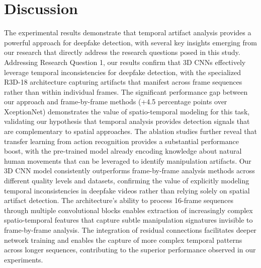 \documentclass[conference]{IEEEtran}
\begin{document}
\section{Discussion}
The experimental results demonstrate that temporal artifact analysis provides a powerful approach for deepfake detection, with several key insights emerging from our research that directly address the research questions posed in this study.
Addressing Research Question 1, our results confirm that 3D CNNs effectively leverage temporal inconsistencies for deepfake detection, with the specialized R3D-18 architecture capturing artifacts that manifest across frame sequences rather than within individual frames.
The significant performance gap between our approach and frame-by-frame methods (+4.5 percentage points over XceptionNet) demonstrates the value of spatio-temporal modeling for this task, validating our hypothesis that temporal analysis provides detection signals that are complementary to spatial approaches.
The ablation studies further reveal that transfer learning from action recognition provides a substantial performance boost, with the pre-trained model already encoding knowledge about natural human movements that can be leveraged to identify manipulation artifacts.
Our 3D CNN model consistently outperforms frame-by-frame analysis methods across different quality levels and datasets, confirming the value of explicitly modeling temporal inconsistencies in deepfake videos rather than relying solely on spatial artifact detection.
The architecture's ability to process 16-frame sequences through multiple convolutional blocks enables extraction of increasingly complex spatio-temporal features that capture subtle manipulation signatures invisible to frame-by-frame analysis.
The integration of residual connections facilitates deeper network training and enables the capture of more complex temporal patterns across longer sequences, contributing to the superior performance observed in our experiments.
\end{document}
